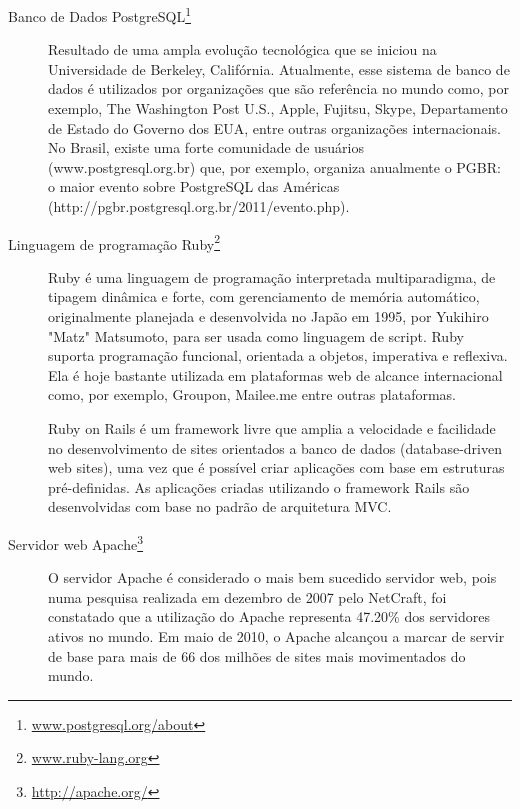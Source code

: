 \documentclass{article}
\begin{document}
\begin{description}

  \item [Banco de Dados PostgreSQL\footnote{\url{www.postgresql.org/about}}]

  Resultado de uma ampla evolução tecnológica que se iniciou na Universidade de
  Berkeley, Califórnia. Atualmente, esse sistema de banco de dados é utilizados
  por organizações que são referência no mundo como, por exemplo, The
  Washington Post U.S., Apple, Fujitsu, Skype, Departamento de Estado do
  Governo dos EUA, entre outras organizações internacionais.  No Brasil, existe
  uma forte comunidade de usuários (www.postgresql.org.br) que, por exemplo,
  organiza anualmente o PGBR: o maior evento sobre PostgreSQL das Américas
  (http://pgbr.postgresql.org.br/2011/evento.php).

  \item [Linguagem de programação Ruby\footnote{\url{www.ruby-lang.org}}]

  Ruby é uma linguagem de programação interpretada multiparadigma, de tipagem
  dinâmica e forte, com gerenciamento de memória automático, originalmente
  planejada e desenvolvida no Japão em 1995, por Yukihiro "Matz" Matsumoto,
  para ser usada como linguagem de script. Ruby suporta programação funcional,
  orientada a objetos, imperativa e reflexiva. Ela é hoje bastante utilizada em
  plataformas web de alcance internacional como, por exemplo, Groupon,
  Mailee.me entre outras plataformas.

  Ruby on Rails é um framework livre que amplia a velocidade e facilidade no
  desenvolvimento de sites orientados a banco de dados (database-driven web
  sites), uma vez que é possível criar aplicações com base em estruturas
  pré-definidas. As aplicações criadas utilizando o framework Rails são
  desenvolvidas com base no padrão de arquitetura MVC.

  \item [Servidor web Apache\footnote{\url{http://apache.org/}}]

  O servidor Apache é considerado o mais bem sucedido servidor web, pois numa
  pesquisa realizada em dezembro de 2007 pelo NetCraft, foi constatado que a
  utilização do Apache representa 47.20\% dos servidores ativos no mundo. Em
  maio de 2010, o Apache alcançou a marcar de servir de base para mais de  66%
  dos milhões de sites mais movimentados do mundo.
 
\end{description}
\end{document}
